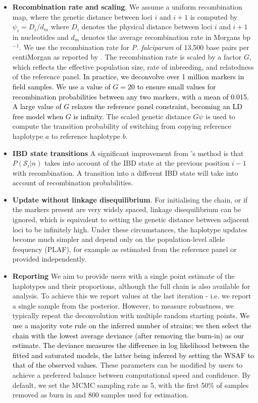 \documentclass[9pt]{article}
\begin{document}
\begin{itemize}
\begin{itemize}
\item {\bf Recombination rate and scaling}. We assume a uniform recombination map, where the genetic distance between loci $i$ and $i+1$ is computed by $\psi_i = D_i / d_m$ where $D_i$ denotes the physical distance between loci $i$ and $i+1$ in nucleotides and $d_m$ denotes the average recombination rate in Morgans bp$^{-1}$. We use the recombination rate for {\it P. falciparum} of 13,500 base pairs per centiMorgan as reported by \citet{Miles2016}. The recombination rate is scaled by a factor $G$, which reflects the effective population size, rate of inbreeding, and relatedness of the reference panel. \textcolor{black}{In practice, we deconvolve over 1 million markers in field samples. We use a value of $G=20$ to ensure small values for recombination probabilities between any two markers, with a mean of 0.015. A large value of $G$ relaxes the reference panel constraint, becoming an LD free model when $G$ is infinity.}  The scaled genetic distance $G\psi$ is used to compute the transition probability of switching from copying reference haplotype $a$ to reference haplotype $b$.

\item {\bf IBD state transitions} A significant improvement from \citet{Zhu2017}'s method is that $P(\mathcal{S}_{i}|n)$ takes into account of the IBD state at the previous position $i-1$ with recombination. A transition into a different IBD state will take into account of recombination probabilities.

\item {\bf Update without linkage disequilibrium}. For initialising the chain, or if the markers present are very widely spaced, linkage disequilibrium can be ignored, which is equivalent to setting the genetic distance between adjacent loci to be infinitely high.  Under these circumstances, the haplotype updates become much simpler and depend only on the population-level allele frequency (PLAF), for example as estimated from the reference panel or provided independently.

\item {\bf Reporting} We aim to provide users with a single point estimate of the haplotypes and their proportions, although the full chain is also available for analysis.  To achieve this we report values at the last iteration - i.e. we report a single sample from the posterior.  However, to measure robustness, we typically repeat the deconvolution with multiple random starting points\textcolor{black}{. We use a majority vote rule on the inferred number of strains; we then select the chain with the lowest average deviance (after removing the burn-in) as our estimate. The deviance measures the difference in log likelihood between the fitted and saturated models, the latter being inferred by setting the WSAF to that of the observed values.} These parameters can be modified by users to achieve a preferred balance between computational speed and confidence.  By default, we set the MCMC sampling rate as 5, with the first 50\% of samples removed as burn in and 800 samples used for estimation.


\end{itemize}
\end{itemize}
\end{document}

